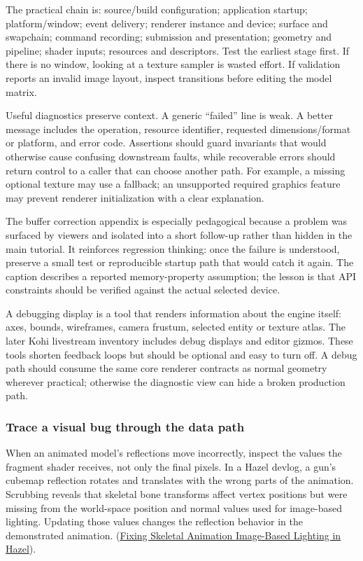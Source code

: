 The practical chain is: source/build configuration; application startup; platform/window; event delivery; renderer instance and device; surface and swapchain; command recording; submission and presentation; geometry and pipeline; shader inputs; resources and descriptors. Test the earliest stage first. If there is no window, looking at a texture sampler is wasted effort. If validation reports an invalid image layout, inspect transitions before editing the model matrix.

Useful diagnostics preserve context. A generic ``failed'' line is weak. A better message includes the operation, resource identifier, requested dimensions/format or platform, and error code. Assertions should guard invariants that would otherwise cause confusing downstream faults, while recoverable errors should return control to a caller that can choose another path. For example, a missing optional texture may use a fallback; an unsupported required graphics feature may prevent renderer initialization with a clear explanation.

The buffer correction appendix is especially pedagogical because a problem was surfaced by viewers and isolated into a short follow-up rather than hidden in the main tutorial. It reinforces regression thinking: once the failure is understood, preserve a small test or reproducible startup path that would catch it again. The caption describes a reported memory-property assumption; the lesson is that API constraints should be verified against the actual selected device.

A debugging display is a tool that renders information about the engine itself: axes, bounds, wireframes, camera frustum, selected entity or texture atlas. The later Kohi livestream inventory includes debug displays and editor gizmos. These tools shorten feedback loops but should be optional and easy to turn off. A debug path should consume the same core renderer contracts as normal geometry wherever practical; otherwise the diagnostic view can hide a broken production path.

\subsubsection{Trace a visual bug through the data path}\label{06-engine-ii-ch041-trace-a-visual-bug-through-the-data-path}

When an animated model's reflections move incorrectly, inspect the values the fragment shader receives, not only the final pixels. In a Hazel devlog, a gun's cubemap reflection rotates and translates with the wrong parts of the animation. Scrubbing reveals that skeletal bone transforms affect vertex positions but were missing from the world-space position and normal values used for image-based lighting. Updating those values changes the reflection behavior in the demonstrated animation. (\href{https://www.youtube.com/watch?v=fs9ChRr4VHM&t=4m18s}{Fixing Skeletal Animation Image-Based Lighting in Hazel}).


